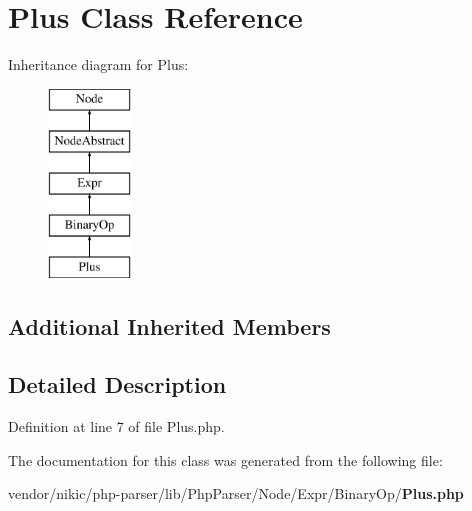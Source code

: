\section{Plus Class Reference}
\label{class_php_parser_1_1_node_1_1_expr_1_1_binary_op_1_1_plus}
Inheritance diagram for Plus\+:\begin{figure}[H]
\begin{center}
\leavevmode
\includegraphics[height=5.000000cm]{class_php_parser_1_1_node_1_1_expr_1_1_binary_op_1_1_plus}
\end{center}
\end{figure}
\subsection*{Additional Inherited Members}


\subsection{Detailed Description}


Definition at line 7 of file Plus.\+php.



The documentation for this class was generated from the following file\+:\begin{DoxyCompactItemize}
\item 
vendor/nikic/php-\/parser/lib/\+Php\+Parser/\+Node/\+Expr/\+Binary\+Op/{\bf Plus.\+php}\end{DoxyCompactItemize}
